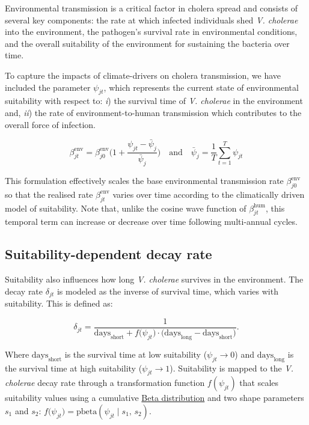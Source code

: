 \documentclass[
]{book}
\begin{document}
Environmental transmission is a critical factor in cholera spread and consists of several key components: the rate at which infected individuals shed \emph{V. cholerae} into the environment, the pathogen's survival rate in environmental conditions, and the overall suitability of the environment for sustaining the bacteria over time.

To capture the impacts of climate-drivers on cholera transmission, we have included the parameter \(\psi_{jt}\), which represents the current state of environmental suitability with respect to: \emph{i}) the survival time of \emph{V. cholerae} in the environment and, \emph{ii}) the rate of environment-to-human transmission which contributes to the overall force of infection.

\begin{equation}
\beta_{jt}^{\text{env}} = \beta_{j0}^{\text{env}} \Bigg(1 + \frac{\psi_{jt}-\bar\psi_j}{\bar\psi_j} \Bigg) \quad \text{and} \quad \bar\psi_j = \frac{1}{T} \sum_{t=1}^{T} \psi_{jt}
\label{eq:beta2}
\end{equation}

This formulation effectively scales the base environmental transmission rate \(\beta_{j0}^{\text{env}}\) so that the realised rate \(\beta_{jt}^{\text{env}}\) varies over time according to the climatically driven model of suitability. Note that, unlike the cosine wave function of \(\beta_{jt}^{\text{hum}}\), this temporal term can increase or decrease over time following multi-annual cycles.

\subsection{Suitability-dependent decay rate}\label{suitability-dependent-decay-rate}

Suitability also influences how long \emph{V. cholerae} survives in the environment. The decay rate \(\delta_{jt}\) is modeled as the inverse of survival time, which varies with suitability. This is defined as:

\[
\delta_{jt} = \frac{1}{\text{days}_{\text{short}} + f\big(\psi_{jt}\big) \cdot \big(\text{days}_{\text{long}} - \text{days}_{\text{short}}\big)}.
\label{eq:delta}
\]

Where \(\text{days}_{\text{short}}\) is the survival time at low suitability (\(\psi_{jt}\!\to\!0\)) and \(\text{days}_{\text{long}}\) is the survival time at high suitability (\(\psi_{jt}\!\to\!1\)). Suitability is mapped to the \emph{V. cholerae} decay rate through a transformation function \(f(\psi_{jt})\) that scales suitability values using a cumulative \href{https://en.wikipedia.org/wiki/Beta_distribution}{Beta distribution} and two shape parameters \(s_1\) and \(s_2\): \(f\big(\psi_{jt}\big) = \text{pbeta}(\psi_{jt} \mid s_1, \, s_2)\).
\end{document}
